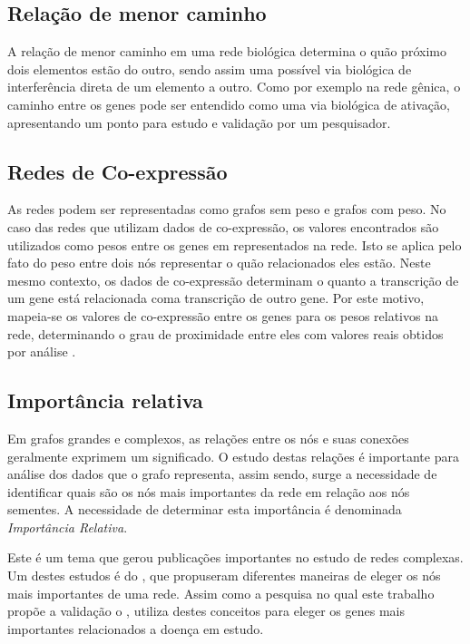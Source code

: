 \subsection{Relação de menor caminho}

A relação de menor caminho em uma rede biológica determina o quão próximo dois elementos estão do outro, sendo assim uma possível via biológica de interferência direta de um elemento a outro. Como por exemplo na rede gênica, o caminho entre os genes pode ser entendido como uma via biológica de ativação, apresentando um ponto para estudo e validação por um pesquisador.

\subsection{Redes de Co-expressão}
As redes podem ser representadas como grafos sem peso e grafos com peso. No caso das redes que utilizam dados de co-expressão, os valores encontrados são utilizados como pesos entre os genes em representados na rede. Isto se aplica pelo fato do peso entre dois nós representar o quão relacionados eles estão. Neste mesmo contexto, os dados de co-expressão determinam o quanto a transcrição de um gene está relacionada coma transcrição de outro gene. Por este motivo, mapeia-se os valores de co-expressão entre os genes para os pesos relativos na rede, determinando o grau de proximidade entre eles com valores reais obtidos por análise \cite{Gaiteri2014}.


\subsection{Importância relativa}

Em grafos grandes e complexos, as relações entre os nós e suas conexões geralmente exprimem um significado. O estudo destas relações é importante para análise dos dados que o grafo representa, assim sendo,
surge a necessidade de identificar quais são os nós mais importantes da rede em relação aos nós sementes. A necessidade de determinar esta importância é denominada \textsl{Importância Relativa}. 
%

Este é um tema que gerou publicações importantes no estudo de redes complexas. Um destes estudos é do \cite{White2003}, que propuseram diferentes maneiras de eleger os nós mais importantes de uma rede. Assim como a pesquisa no qual este trabalho propõe a validação o \cite{Simoes2015}, utiliza destes conceitos para eleger os genes mais importantes relacionados a doença em estudo.
%

